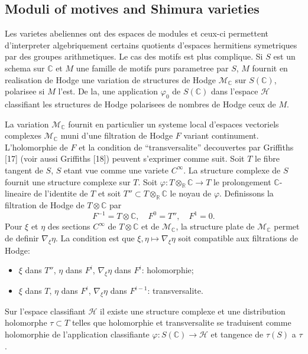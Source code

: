 \documentclass[11pt,a4paper]{article}
\theoremstyle{plain}
\theoremstyle{definition}
\newcommand{\C}{\mathbb{C}}
\newcommand{\R}{\mathbb{R}}
\begin{document}
\subsection{Moduli of motives and Shimura varieties}

Les varietes abeliennes ont des espaces de modules et ceux-ci permettent d'interpreter algebriquement certains quotients d'espaces hermitiens symetriques par des groupes arithmetiques. Le cas des motifs est plus complique. Si $S$ est un schema sur $\C$ et $M$ une famille de motifs purs parametree par $S$, $M$ fournit en realisation de Hodge une variation de structures de Hodge $\mathcal{M}_{\C}$ sur $S(\C)$, polarisee si $M$ l'est. De la, une application $\varphi_0$ de $S(\C)$ dans l'espace $\mathscr{H}$ classifiant les structures de Hodge polarisees de nombres de Hodge ceux de $M$.

La variation $\mathcal{M}_{\C}$ fournit en particulier un systeme local d'espaces vectoriels complexes $\mathcal{M}_{\C}$ muni d'une filtration de Hodge $F$ variant continument. L'holomorphie de $F$ et la condition de ``transversalite'' decouvertes par Griffiths [17] (voir aussi Griffiths [18]) peuvent s'exprimer comme suit. Soit $T$ le fibre tangent de $S$, $S$ etant vue comme une variete $C^{\infty}$. La structure complexe de $S$ fournit une structure complexe sur $T$. Soit $\varphi: T \otimes_{\R} \C \to T$ le prolongement $\C$-lineaire de l'identite de $T$ et soit $T'' \subset T \otimes_{\R} \C$ le noyau de $\varphi$. Definissons la filtration de Hodge de $T \otimes \C$ par
$$
F^{-1} = T \otimes \C, \quad F^0 = T'', \quad F^1 = 0.
$$
Pour $\xi$ et $\eta$ des sections $C^{\infty}$ de $T \otimes \C$ et de $\mathcal{M}_{\C}$, la structure plate de $\mathcal{M}_{\C}$ permet de definir $\nabla_{\xi} \eta$. La condition est que $\xi, \eta \mapsto \nabla_{\xi} \eta$ soit compatible aux filtrations de Hodge:
\begin{itemize}
\item[] $\xi$ dans $T''$, $\eta$ dans $F^i$, $\nabla_{\xi} \eta$ dans $F^i$: holomorphie;
\item[] $\xi$ dans $T$, $\eta$ dans $F^i$, $\nabla_{\xi} \eta$ dans $F^{i-1}$: transversalite.
\end{itemize}

Sur l'espace classifiant $\mathscr{H}$ il existe une structure complexe et une distribution holomorphe $\tau \subset T$ telles que holomorphie et transversalite se traduisent comme holomorphie de l'application classifiante $\varphi: S(\C) \to \mathscr{H}$ et tangence de $\tau(S)$ a $\tau$.
\end{document}
